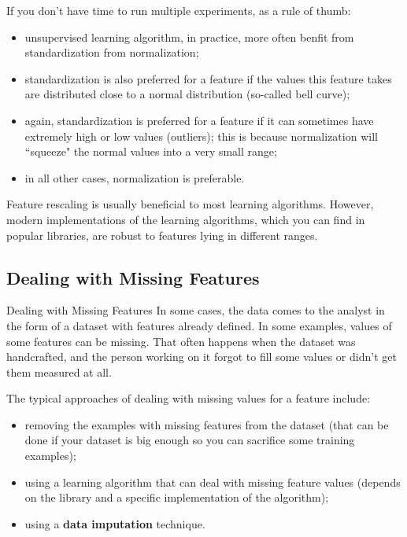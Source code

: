 \documentclass[9pt,dvipsnames]{beamer}
\begin{document}
	\begin{frame}
		If you don't have time to run multiple experiments, as a rule of thumb:
		\begin{itemize}
			\item unsupervised learning algorithm, in practice, more often benfit from standardization from normalization;
			\item standardization is also preferred for a feature if the values this feature takes are distributed close to a normal distribution (so-called bell curve);
			\item again, standardization is preferred for a feature if it can sometimes have extremely high or low values (outliers); this is because normalization will ``squeeze" the normal values into a very small range;
			\item in all other cases, normalization is preferable. 
		\end{itemize}
		
		Feature rescaling is usually beneficial to most learning algorithms. However, modern implementations of the learning algorithms, which you can find in popular libraries, are robust to features lying in different ranges.
	\end{frame}
	
	\subsection{Dealing with Missing Features}
	\begin{frame}{Dealing with Missing Features}
		In some cases, the data comes to the analyst in the form of a dataset with features already defined. In some examples, values of some features can be missing. That often happens when the dataset was handcrafted, and the person working on it forgot to fill some values or didn't get them measured at all.
		
		The typical approaches of dealing with missing values for a feature include:
		\begin{itemize}
			\item removing the examples with missing features from the dataset (that can be done if your dataset is big enough so you can sacrifice some training examples);
			\item using a learning algorithm that can deal with missing feature values (depends on the library and a specific implementation of the algorithm);
			\item using a \textbf{data imputation} technique.
		\end{itemize}
	\end{frame}
	
\end{document}
